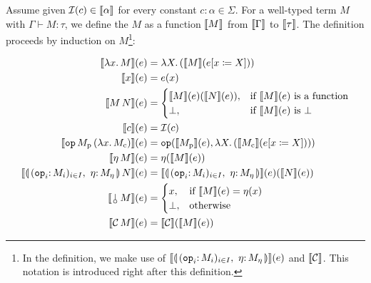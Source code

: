 \begin{definition}
  Assume given $\mathcal{I}(c) \in \llbracket \alpha \rrbracket$ for every constant
  $c : \alpha \in \Sigma$. For a well-typed term $M$ with
  $\Gamma \vdash M : \tau$, we define the 
  $M$ as a function $\llbracket M \rrbracket$ from $\llbracket \Gamma \rrbracket$ to $\llbracket \tau \rrbracket$. The
  definition proceeds by induction on $M$\footnote{In the definition, we
    make use of $\sem{\cibanana}(e)$ and $\llbracket \mathcal{C} \rrbracket$. This notation is
    introduced right after this definition.}:
  
  \begin{align*}
    \sem{\lam{x}{M}}(e) &= \lam{X}{(\sem{M}(\subst{e}{x}{X}))} \\
    \sem{x}(e) &= e(x) \\
    \sem{\ap{M}{N}}(e) &= \begin{cases}
      \sem{M}(e)(\sem{N}(e)),& \text{if $\sem{M}(e)$ is a function} \\
      \bot, & \text{if $\sem{M}(e)$ is $\bot$}
    \end{cases} \\
    \sem{c}(e) &= \II(c) \\
    \sem{\app{\op{op}}{M_\petitp}{(\lam{x}{M_\petitc})}}(e) &=
      \op{op}(\sem{M_\petitp}(e), \lam{X}{(\sem{M_\petitc}({\subst{e}{x}{X}}))}) \\
    \sem{\etaE{M}}(e) &= \eta(\sem{M}(e)) \\
    \sem{\ap{\cibanana}{N}}(e) &= \sem{\cibanana}(e)(\sem{N}(e)) \\
    \sem{\ap{\cherry}{M}}(e) &= \begin{cases}
      x, & \text{if $\sem{M}(e) = \eta(x)$} \\
      \bot, & \text{otherwise} \\
    \end{cases} \\
    \sem{\ap{\CC}{M}}(e) &= \sem{\CC}(\sem{M}(e))
  \end{align*}
\end{definition}

